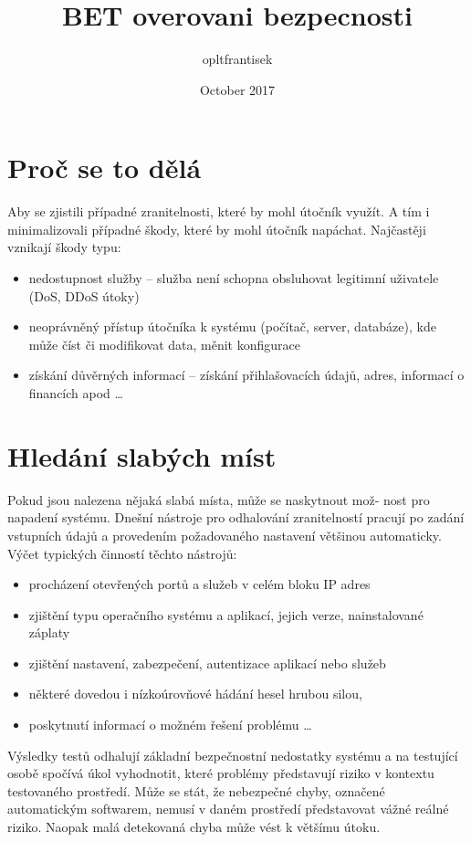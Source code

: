 \documentclass{article}
\title{BET overovani bezpecnosti}
\author{opltfrantisek }
\date{October 2017}
\begin{document}
\begin{large}
 

\maketitle

\section{Proč se to dělá}Aby se zjistili případné zranitelnosti, které by mohl útočník využít. A tím i minimalizovali případné škody, které by mohl útočník napáchat. Najčastěji vznikají škody typu:
\begin{itemize}  
\item nedostupnost služby – služba není schopna obsluhovat legitimní uživatele (DoS,
DDoS útoky)
\item neoprávněný přístup útočníka k systému (počítač, server, databáze), kde může číst
či modifikovat data, měnit konfigurace
\item získání důvěrných informací – získání přihlašovacích údajů, adres, informací o financích
apod \ldots 
\end{itemize}

\section{Hledání slabých míst}
Pokud jsou nalezena nějaká slabá místa, může se naskytnout mož-
nost pro napadení systému. Dnešní nástroje pro odhalování zranitelností pracují po zadání
vstupních údajů a provedením požadovaného nastavení většinou automaticky. Výčet typických
činností těchto nástrojů:
\begin{itemize}  
\item procházení otevřených portů a služeb v celém bloku IP adres
\item zjištění typu operačního systému a aplikací, jejich verze, nainstalované záplaty
\item  zjištění nastavení, zabezpečení, autentizace aplikací nebo služeb
\item některé dovedou i nízkoúrovňové hádání hesel hrubou silou,
\item poskytnutí informací o možném řešení problému \ldots 
\end{itemize}
Výsledky testů odhalují základní bezpečnostní nedostatky systému a na testující osobě
spočívá úkol vyhodnotit, které problémy představují riziko v kontextu testovaného prostředí.
Může se stát, že nebezpečné chyby, označené automatickým softwarem, nemusí
v daném prostředí představovat vážné reálné riziko. Naopak malá detekovaná chyba může
vést k většímu útoku.

\end{large}
\end{document}
